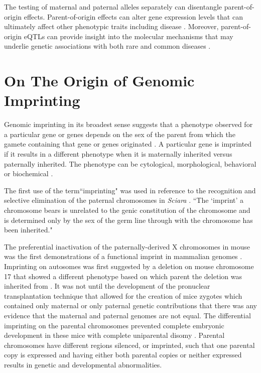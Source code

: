 The testing of maternal and paternal alleles separately can disentangle parent-of-origin effects. Parent-of-origin effects can alter gene expression levels that can ultimately affect other phenotypic traits including disease \cite{Lawson2013,Peters2014}. Moreover, parent-of-origin eQTLs can provide insight into the molecular mechanisms that may underlie genetic associations with both rare and common diseases \cite{Lawson2013,Peters2014,Kong:2009kk,Stridh2014,Falls1999}.



\section{On The Origin of Genomic Imprinting }

Genomic imprinting in its broadest sense suggests that a phenotype observed for a particular gene or genes depends on the sex of the parent from which the gamete containing that gene or genes originated \cite{Sapienza:1989vm}. A particular gene is imprinted if it results in a different phenotype when it is maternally inherited versus paternally inherited. The phenotype can be cytological, morphological, behavioral or biochemical \cite{Sapienza:1989vm}.

The first use of the term``imprinting" was used in reference to the recognition and selective elimination of the paternal chromosomes in \textit{Sciara} \cite{Crouse:1960vc,Sapienza:1989vm}. ``The `imprint' a chromosome bears is unrelated to the genic constitution of the chromosome and is determined only by the sex of the germ line through with the chromosome has been inherited." \cite{Crouse:1960vc} 

The preferential inactivation of the paternally-derived X chromosomes in mouse was the first demonstrations of a functional imprint in mammalian genomes \cite{Takagi:1975ua,Lyon:1984gh,Chandra:1975tb}. Imprinting on autosomes was first suggested by a deletion on mouse chromosome 17 that showed a different phenotype based on which parent the deletion was inherited from \cite{Johnson:1974uf,Johnson:1974kc}. It was not until the development of the pronuclear transplantation technique that allowed for the creation of mice zygotes which contained only maternal or only paternal genetic contributions that there was any evidence that the maternal and paternal genomes are not equal. The differential imprinting on the parental chromosomes prevented complete embryonic development in these mice with complete uniparental disomy \cite{Sapienza:1989vm,McGrath:1984ky}. Parental chromosomes have different regions silenced, or imprinted, such that one parental copy is expressed and having either both parental copies or neither expressed results in genetic and developmental abnormalities.


